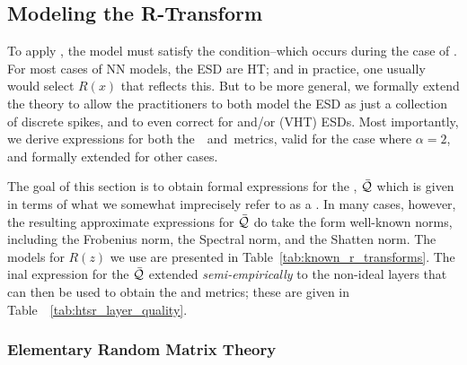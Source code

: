 \subsection{Modeling the R-Transform}
\label{sxn:r_transforms}

To apply \SETOL, the model must satisfy the \TRACELOG condition--which occurs during the case of \IdealLearning.
For most cases of NN models, the ESD are HT; and in practice, one usually would select $R(x)$ that reflects this.
But to be more general, we formally extend the theory to allow the practitioners to
both model the ESD as just a collection of discrete spikes, and to even correct for
\CorrelationTraps and/or \VeryHeavyTailed (VHT) ESDs.
Most importantly,  we derive expressions for both the~\WW~\ALPHA and~\ALPHAHAT metrics, valid
for the case \IdealLearning where $\alpha=2$, and formally extended for other cases.

The goal of this section is to obtain formal expressions for the \LayerQuality, $\bar{\mathcal{Q}}$ which is
given in terms of what we somewhat imprecisely refer to as a \GEN.
In many cases, however, the resulting approximate expressions for $\bar{\mathcal{Q}}$ do take the
form well-known norms, including the Frobenius norm, the Spectral norm, and the Shatten norm.
The models for $R(z)$  we use are presented in Table~\ref{tab:known_r_transforms}.
The inal expression for the \LayerQuality $\bar{\mathcal{Q}}$ extended \emph{semi-empirically} to the non-ideal layers that can then be used to obtain the \HTSR \ALPHA and \ALPHAHAT metrics; these  are given in Table~~\ref{tab:htsr_layer_quality}.

\subsubsection{Elementary Random Matrix Theory}
\label{sxn:r_transforms:elementary_rmt}

